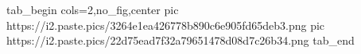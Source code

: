  
 
 
 
 
\qqSecCmtScr

\ifcmt
  tab_begin cols=2,no_fig,center
     pic https://i2.paste.pics/3264e1ea426778b890c6e905fd65deb3.png
		 pic https://i2.paste.pics/22d75ead7f32a79651478d08d7c26b34.png
  tab_end
\fi
